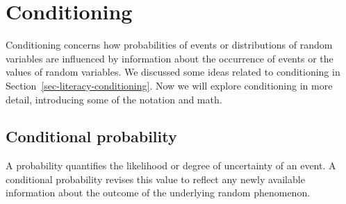 \documentclass[
  letterpaper,
  DIV=11,
  numbers=noendperiod]{scrreprt}
\theoremstyle{plain}
\theoremstyle{definition}
\theoremstyle{definition}
\theoremstyle{definition}
\theoremstyle{remark}
\begin{document}
\section{Conditioning}\label{sec-cond}

Conditioning concerns how probabilities of events or distributions of
random variables are influenced by information about the occurrence of
events or the values of random variables. We discussed some ideas
related to conditioning in Section~\ref{sec-literacy-conditioning}. Now
we will explore conditioning in more detail, introducing some of the
notation and math.

\subsection{Conditional probability}\label{conditional-probability}

A probability quantifies the likelihood or degree of uncertainty of an
event. A conditional probability revises this value to reflect any newly
available information about the outcome of the underlying random
phenomenon.
\end{document}
